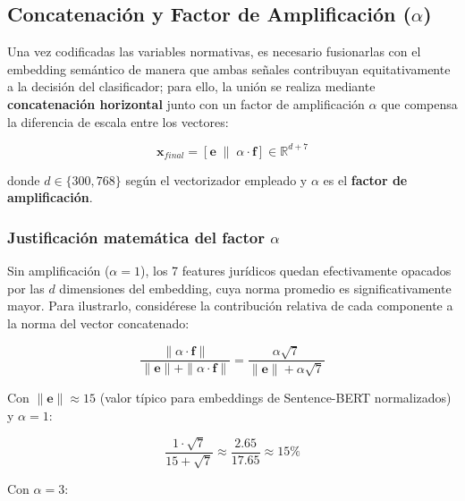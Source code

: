 \subsection{Concatenación y Factor de Amplificación ($\alpha$)}

Una vez codificadas las variables normativas, es necesario fusionarlas con el
embedding semántico de manera que ambas señales contribuyan equitativamente a la
decisión del clasificador; para ello, la unión se realiza mediante
\textbf{concatenación horizontal} junto con un factor de amplificación $\alpha$
que compensa la diferencia de escala entre los vectores:

\begin{equation}
  \mathbf{x}_{final}
  = \left[\mathbf{e} \;\|\; \alpha \cdot \mathbf{f}\right]
  \in \mathbb{R}^{d + 7}
  \label{eq:concat}
\end{equation}

donde $d \in \{300, 768\}$ según el vectorizador empleado y $\alpha$ es el
\textbf{factor de amplificación}.

\subsubsection*{Justificación matemática del factor $\alpha$}

Sin amplificación ($\alpha = 1$), los 7 features jurídicos quedan efectivamente
opacados por las $d$ dimensiones del embedding, cuya norma promedio es
significativamente mayor. Para ilustrarlo, considérese la contribución relativa
de cada componente a la norma del vector concatenado:

\begin{equation}
  \frac{\|\alpha \cdot \mathbf{f}\|}{\|\mathbf{e}\| + \|\alpha \cdot \mathbf{f}\|}
  = \frac{\alpha \sqrt{7}}{\|\mathbf{e}\| + \alpha \sqrt{7}}
  \label{eq:contribucion}
\end{equation}

Con $\|\mathbf{e}\| \approx 15$ (valor típico para embeddings de Sentence-BERT
normalizados) y $\alpha = 1$:

\begin{equation*}
  \frac{1 \cdot \sqrt{7}}{15 + \sqrt{7}} \approx \frac{2.65}{17.65} \approx 15\%
\end{equation*}

Con $\alpha = 3$:

